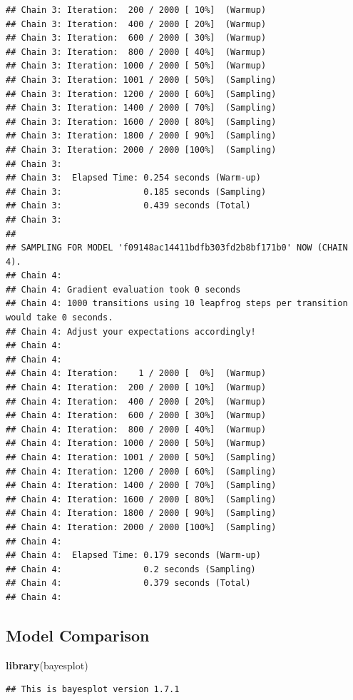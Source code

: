 \documentclass[]{article}
\newenvironment{Shaded}{\begin{snugshade}}{\end{snugshade}}
\newcommand{\KeywordTok}[1]{\textcolor[rgb]{0.13,0.29,0.53}{\textbf{#1}}}
\newcommand{\NormalTok}[1]{#1}
\begin{document}
\begin{verbatim}
## Chain 3: Iteration:  200 / 2000 [ 10%]  (Warmup)
## Chain 3: Iteration:  400 / 2000 [ 20%]  (Warmup)
## Chain 3: Iteration:  600 / 2000 [ 30%]  (Warmup)
## Chain 3: Iteration:  800 / 2000 [ 40%]  (Warmup)
## Chain 3: Iteration: 1000 / 2000 [ 50%]  (Warmup)
## Chain 3: Iteration: 1001 / 2000 [ 50%]  (Sampling)
## Chain 3: Iteration: 1200 / 2000 [ 60%]  (Sampling)
## Chain 3: Iteration: 1400 / 2000 [ 70%]  (Sampling)
## Chain 3: Iteration: 1600 / 2000 [ 80%]  (Sampling)
## Chain 3: Iteration: 1800 / 2000 [ 90%]  (Sampling)
## Chain 3: Iteration: 2000 / 2000 [100%]  (Sampling)
## Chain 3: 
## Chain 3:  Elapsed Time: 0.254 seconds (Warm-up)
## Chain 3:                0.185 seconds (Sampling)
## Chain 3:                0.439 seconds (Total)
## Chain 3: 
## 
## SAMPLING FOR MODEL 'f09148ac14411bdfb303fd2b8bf171b0' NOW (CHAIN 4).
## Chain 4: 
## Chain 4: Gradient evaluation took 0 seconds
## Chain 4: 1000 transitions using 10 leapfrog steps per transition would take 0 seconds.
## Chain 4: Adjust your expectations accordingly!
## Chain 4: 
## Chain 4: 
## Chain 4: Iteration:    1 / 2000 [  0%]  (Warmup)
## Chain 4: Iteration:  200 / 2000 [ 10%]  (Warmup)
## Chain 4: Iteration:  400 / 2000 [ 20%]  (Warmup)
## Chain 4: Iteration:  600 / 2000 [ 30%]  (Warmup)
## Chain 4: Iteration:  800 / 2000 [ 40%]  (Warmup)
## Chain 4: Iteration: 1000 / 2000 [ 50%]  (Warmup)
## Chain 4: Iteration: 1001 / 2000 [ 50%]  (Sampling)
## Chain 4: Iteration: 1200 / 2000 [ 60%]  (Sampling)
## Chain 4: Iteration: 1400 / 2000 [ 70%]  (Sampling)
## Chain 4: Iteration: 1600 / 2000 [ 80%]  (Sampling)
## Chain 4: Iteration: 1800 / 2000 [ 90%]  (Sampling)
## Chain 4: Iteration: 2000 / 2000 [100%]  (Sampling)
## Chain 4: 
## Chain 4:  Elapsed Time: 0.179 seconds (Warm-up)
## Chain 4:                0.2 seconds (Sampling)
## Chain 4:                0.379 seconds (Total)
## Chain 4:
\end{verbatim}

\hypertarget{model-comparison}{%
\subsection{Model Comparison}\label{model-comparison}}

\begin{Shaded}
\begin{Highlighting}[]
\KeywordTok{library}\NormalTok{(bayesplot)}
\end{Highlighting}
\end{Shaded}

\begin{verbatim}
## This is bayesplot version 1.7.1
\end{verbatim}
\end{document}
